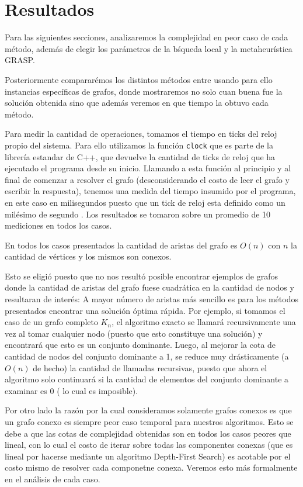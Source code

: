 \section{Resultados}
\label{sec::resultados}

Para las siguientes secciones, analizaremos la complejidad en peor caso
de cada m\'etodo, adem\'as de elegir los par\'ametros de la 
b\'squeda local y la metaheur\'istica GRASP.

Posteriormente comparar\'emos los distintos m\'etodos entre usando para
ello instancias espec\'ificas de grafos, donde mostraremos no solo cuan
buena fue la soluci\'on obtenida sino que adem\'as veremos en que tiempo
la obtuvo cada m\'etodo.

Para medir la cantidad de  operaciones, tomamos el tiempo en ticks del 
reloj propio del sistema. Para ello utilizamos la funci\'on 
\texttt{clock} que es parte de la librer\'ia estandar de C++, que 
devuelve la cantidad de ticks de reloj que ha ejecutado el programa 
desde su inicio. Llamando a esta funci\'on al principio y al final de 
comenzar a resolver el grafo (desconsiderando el costo de leer el grafo 
y escribir la respuesta), tenemos una medida del tiempo insumido por el 
programa, en este caso en milisegundos puesto que un tick de reloj esta
definido como un mil\'esimo de segundo . Los resultados se tomaron sobre 
un promedio de 10 mediciones en todos los casos.

En todos los casos presentados la cantidad de aristas del grafo es 
$O(n)$ con $n$ la cantidad de v\'ertices y los mismos son conexos.

Esto se eligi\'o puesto que no nos result\'o posible encontrar ejemplos 
de grafos donde la cantidad de aristas  del grafo fuese cuadr\'atica 
en la cantidad de nodos y resultaran de inter\'es: A mayor n\'umero de 
aristas m\'as sencillo es para los m\'etodos presentados encontrar 
una soluci\'on \'optima r\'apida. Por ejemplo, si tomamos el caso de un
grafo completo $K_n$, el algoritmo exacto se llamar\'a recursivamente 
una vez al tomar cualquier nodo (puesto que esto constituye una 
soluci\'on) y encontrar\'a que esto es un conjunto dominante. Luego, al
mejorar la cota de cantidad de nodos del conjunto dominante a 1, se 
reduce muy dr\'asticamente (a $O(n)$ de hecho) la cantidad de llamadas
recursivas, puesto que ahora el algoritmo solo continuar\'a si la 
cantidad de elementos del conjunto dominante a examinar es 0 (
lo cual es imposible).

Por otro lado la raz\'on por la cual consideramos solamente grafos 
conexos es que un grafo conexo es siempre peor caso temporal para nuestros
algoritmos. Esto se debe a que las cotas de complejidad obtenidas son
en todos los casos peores que lineal, con lo cual el costo de iterar 
sobre todas las componentes conexas (que es lineal por hacerse mediante 
un algoritmo Depth-First Search) es acotable por el costo mismo de 
resolver cada componetne conexa. Veremos esto m\'as formalmente en
el an\'alisis de cada caso. 

